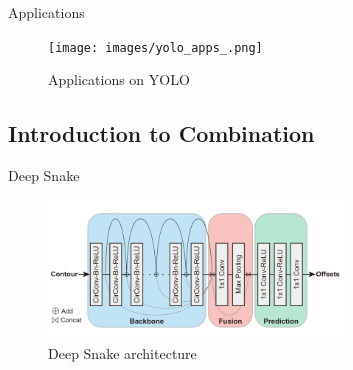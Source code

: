\begin{frame}{Applications}
	\begin{figure}[h]
		\centering
		\texttt{[image: images/yolo\_apps\_.png]}
		\caption{Applications on YOLO}
		\label{fig:yolo_apps}
	\end{figure}
\end{frame}

\subsection{Introduction to Combination}
\begin{frame}{Deep Snake}
	\begin{figure}[h]
		\centering
		\includegraphics[width=0.7\textwidth]{images/deepsnake_architecture.png}
		\caption{Deep Snake architecture}
		\label{fig:deepsnake_architecture}
	\end{figure}
\end{frame}

